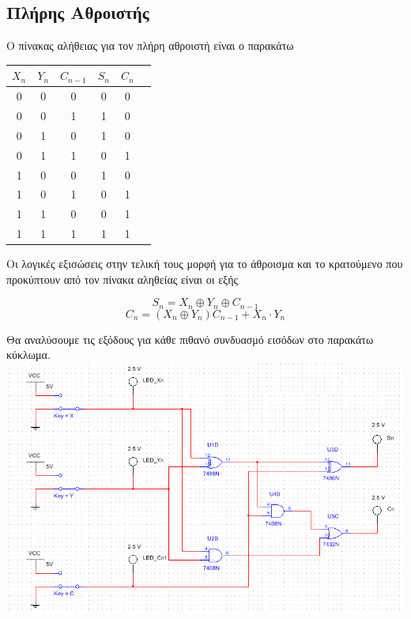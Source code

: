 \documentclass{article}
\begin{document}
\subsection{Πλήρης Αθροιστής}

Ο πίνακας αλήθειας για τον πλήρη αθροιστή είναι ο παρακάτω

\begin{center}
	\begin{tabular}{|c|c|c|c|c|c|}
	\hline
	$X_n$ & $Y_n$ & $C_{n-1}$ & $S_n$ & $C_n$ \\
	\hline
	0 & 0 & 0 & 0 & 0 \\
	0 & 0 & 1 & 1 & 0 \\
	0 & 1 & 0 & 1 & 0 \\
	0 & 1 & 1 & 0 & 1 \\
	1 & 0 & 0 & 1 & 0 \\
	1 & 0 & 1 & 0 & 1 \\
	1 & 1 & 0 & 0 & 1 \\
	1 & 1 & 1 & 1 & 1 \\
	\hline
\end{tabular}
\end{center}

Οι λογικές εξισώσεις στην τελική τους μορφή για το άθροισμα και το κρατούμενο που
προκύπτουν από τον πίνακα αληθείας είναι οι εξής

\[S_n = X_n \oplus Y_n \oplus C_{n-1}\]
\[C_n = (X_n \oplus Y_n)C_{n-1} + X_n \cdot Y_n\]

Θα αναλύσουμε τις εξόδους για κάθε πιθανό συνδυασμό εισόδων στο παρακάτω κύκλωμα. \\
\includegraphics[width=\textwidth]{./res/fa000.png}
\end{document}
